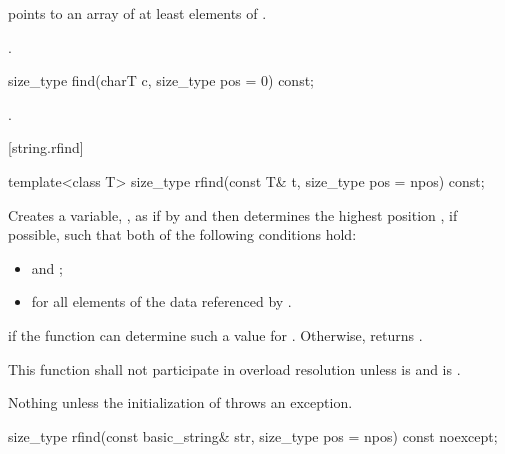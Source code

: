\begin{itemdescr}
\pnum
\requires {} points to an array of at least 
elements of .

\pnum
\returns
{}.
\end{itemdescr}

%
\begin{itemdecl}
size_type find(charT c, size_type pos = 0) const;
\end{itemdecl}

\begin{itemdescr}
\pnum
\returns
{}.
\end{itemdescr}

[string.rfind]{}

%
\begin{itemdecl}
template<class T>
  size_type rfind(const T& t, size_type pos = npos) const;
\end{itemdecl}

\begin{itemdescr}
\pnum
\effects
Creates a variable, , as if by
 and then
determines the highest position , if possible, such that both of
the following conditions hold:
\begin{itemize}
\item
{}
and
;
\item
{}%
for all elements  of the data referenced by .
\end{itemize}

\pnum
\returns
{} if the function can determine such a value for .
Otherwise, returns
.

\pnum
\remarks
This function shall not participate in overload resolution unless
 is  and
 is .

\pnum
\throws
Nothing unless the initialization of  throws an exception.
\end{itemdescr}

%
\begin{itemdecl}
size_type rfind(const basic_string& str, size_type pos = npos) const noexcept;
\end{itemdecl}

